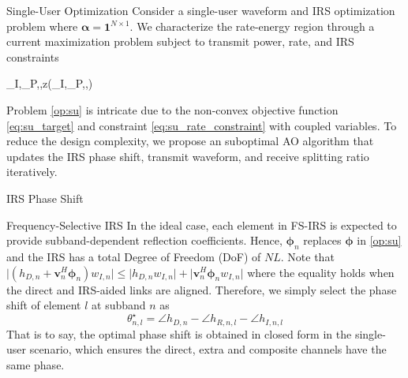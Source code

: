 \documentclass{IEEEtran}
\begin{document}
\begin{section}{Single-User Optimization}
	Consider a single-user waveform and IRS optimization problem where $\boldsymbol{\alpha}=\boldsymbol{1}^{N \times 1}$. We characterize the rate-energy region through a current maximization problem subject to transmit power, rate, and IRS constraints
	\begin{maxi!}
		{_I,_P,\boldsymbol{\phi},\rho}{z(_I,_P,\boldsymbol{\phi},\rho)}{\label{op:su}}{\label{eq:su_target}}
		\label{eq:su_rate_constraint}
	\end{maxi!}
	Problem \ref{op:su} is intricate due to the non-convex objective function \ref{eq:su_target} and constraint \ref{eq:su_rate_constraint} with coupled variables. To reduce the design complexity, we propose an suboptimal AO algorithm that updates the IRS phase shift, transmit waveform, and receive splitting ratio iteratively.

	\begin{subsection}{IRS Phase Shift}
		\begin{subsubsection}{Frequency-Selective IRS}\label{se:fs_irs}
			In the ideal case, each element in FS-IRS is expected to provide subband-dependent reflection coefficients. Hence, $\boldsymbol{\phi}_n$ replaces $\boldsymbol{\phi}$ in \ref{op:su} and the IRS has a total Degree of Freedom (DoF) of $NL$. Note that $\lvert{(h_{D,n}+\boldsymbol{v}_n^H\boldsymbol{\phi}_n)w_{I,n}}\rvert \le \lvert{h_{D,n}w_{I,n}}\rvert+\lvert{\boldsymbol{v}_n^H\boldsymbol{\phi}_n w_{I,n}}\rvert$ where the equality holds when the direct and IRS-aided links are aligned. Therefore, we simply select the phase shift of element $l$ at subband $n$ as
			\begin{equation}\label{eq:theta}
				\theta_{n,l}^\star = \angle{h}_{D,n} - \angle{h_{R,n,l}}-\angle{h_{I,n,l}}
			\end{equation}
			That is to say, the optimal phase shift is obtained in closed form in the single-user scenario, which ensures the direct, extra and composite channels have the same phase.
		\end{subsubsection}


\end{subsection}
\end{section}
\end{document}

